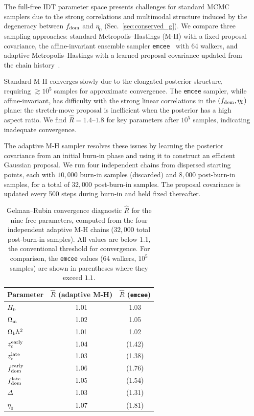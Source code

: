 \documentclass[aps,prd,twocolumn,superscriptaddress,nofootinbib]{revtex4-2}
\newcommand{\Om}{\Omega_{\rm m}}
\newcommand{\Ob}{\Omega_{\rm b}}
\newcommand{\fdom}{f_{\rm dom}}
\newcommand{\zc}{z_{\rm c}}
\newcommand{\Hubble}{H_0}
\newcommand{\etaz}{\eta_0}
\newcommand{\Rhat}{\hat{R}}
\begin{document}
The full-free IDT parameter space presents challenges for standard
MCMC samplers due to the strong correlations and multimodal structure
induced by the degeneracy between $\fdom$ and $\etaz$
(Sec.~\ref{sec:conserved_g}). We compare three sampling approaches:
standard Metropolis--Hastings (M-H) with a fixed proposal covariance,
the affine-invariant ensemble sampler
\texttt{emcee}~\cite{ForemanMackey2013} with 64 walkers, and adaptive
Metropolis--Hastings with a learned proposal covariance updated from
the chain history~\cite{Haario2001}.

Standard M-H converges slowly due to the elongated posterior
structure, requiring $\gtrsim 10^5$ samples for approximate
convergence. The \texttt{emcee} sampler, while affine-invariant, has
difficulty with the strong linear correlations in the
$(\fdom, \etaz)$ plane: the stretch-move proposal is inefficient when
the posterior has a high aspect ratio. We find $\Rhat = 1.4$--$1.8$
for key parameters after $10^5$ samples, indicating inadequate
convergence.

The adaptive M-H sampler resolves these issues by learning the
posterior covariance from an initial burn-in phase and using it to
construct an efficient Gaussian proposal. We run four independent
chains from dispersed starting points, each with $10{,}000$ burn-in
samples (discarded) and $8{,}000$ post-burn-in samples, for a total
of $32{,}000$ post-burn-in samples. The proposal covariance is updated
every 500 steps during burn-in and held fixed thereafter.

\begin{table}[t]
\centering
\caption{Gelman--Rubin convergence diagnostic $\Rhat$ for the nine
  free parameters, computed from the four independent adaptive M-H
  chains ($32{,}000$ total post-burn-in samples). All values are below
  $1.1$, the conventional threshold for convergence. For comparison,
  the \texttt{emcee} values (64 walkers, $10^5$ samples) are shown in
  parentheses where they exceed $1.1$.}
\label{tab:rhat}
\begin{ruledtabular}
\begin{tabular}{lcc}
Parameter & $\Rhat$ (adaptive M-H) & $\Rhat$ (\texttt{emcee}) \\
\hline
$\Hubble$ & 1.01 & 1.03 \\
$\Om$ & 1.02 & 1.05 \\
$\Ob h^2$ & 1.01 & 1.02 \\
$\zc^{\rm early}$ & 1.04 & (1.42) \\
$\zc^{\rm late}$ & 1.03 & (1.38) \\
$\fdom^{\rm early}$ & 1.06 & (1.76) \\
$\fdom^{\rm late}$ & 1.05 & (1.54) \\
$\Delta$ & 1.03 & (1.31) \\
$\etaz$ & 1.07 & (1.81) \\
\end{tabular}
\end{ruledtabular}
\end{table}
\end{document}
